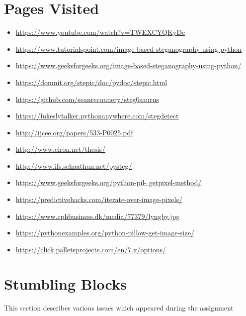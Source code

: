 \documentclass[11pt,a4paper]{article}
\begin{document}
\section{Pages Visited}
\begin{itemize}
	\item \href{https://www.youtube.com/watch?v=TWEXCYQKyDc}{https://www.youtube.com/watch?v=TWEXCYQKyDc}
	\item \href{https://www.tutorialspoint.com/image-based-steganography-using-python}{https://www.tutorialspoint.com/image-based-steganography-using-python}
	\item \href{https://www.geeksforgeeks.org/image-based-steganography-using-python/}{https://www.geeksforgeeks.org/image-based-steganography-using-python/}
	\item \href{https://domnit.org/stepic/doc/pydoc/stepic.html}{https://domnit.org/stepic/doc/pydoc/stepic.html}
	\item \href{https://github.com/seanreconnery/steg0saurus}{https://github.com/seanreconnery/steg0saurus}
	\item \href{https://lukeslytalker.pythonanywhere.com/stegdetect}{https://lukeslytalker.pythonanywhere.com/stegdetect}
	\item \href{http://ijcee.org/papers/533-P0025.pdf}{http://ijcee.org/papers/533-P0025.pdf}
	\item \href{http://www.eiron.net/thesis/}{http://www.eiron.net/thesis/}
	\item \href{http://www.ifs.schaathun.net/pysteg/}{http://www.ifs.schaathun.net/pysteg/}
	\item \href{https://www.geeksforgeeks.org/python-pil-getpixel-method/}{https://www.geeksforgeeks.org/python-pil-			getpixel-method/}
	\item \href{https://predictivehacks.com/iterate-over-image-pixels/}{https://predictivehacks.com/iterate-over-image-pixels/}
	\item \href{https://www.cphbusiness.dk/media/77379/lyngby.jpg}{https://www.cphbusiness.dk/media/77379/lyngby.jpg}
	\item \href{https://pythonexamples.org/python-pillow-get-image-size/}{https://pythonexamples.org/python-pillow-get-image-size/}
	\item \href{https://click.palletsprojects.com/en/7.x/options/}{https://click.palletsprojects.com/en/7.x/options/}
	
\end{itemize}

\section{Stumbling Blocks}
This section describes various issues which appeared during the assignment\\
\end{document}
